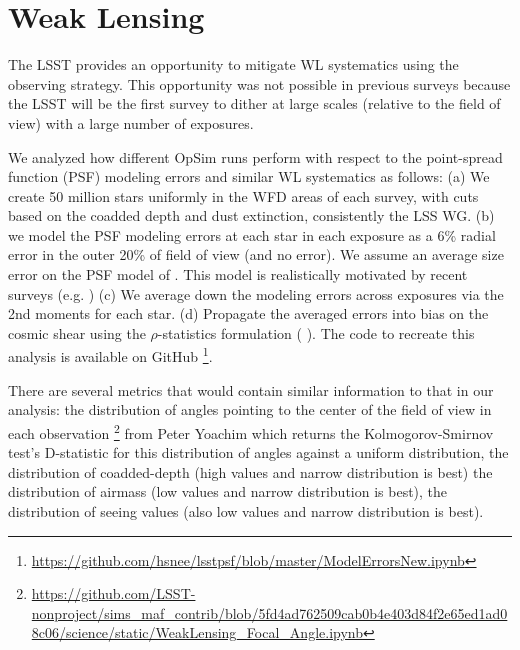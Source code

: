 \section{Weak Lensing}\label{sec:wl}

The LSST provides an opportunity to mitigate WL systematics using the observing strategy. This opportunity was not possible in previous surveys because the LSST will be the first survey to dither at large scales (relative to the field of view) with a large number of exposures.

We analyzed how different OpSim runs perform with respect to the point-spread function (PSF) modeling errors and similar WL systematics as follows: (a) We create 50 million stars uniformly in the WFD areas of each survey, with cuts based on the coadded depth and dust extinction, consistently the LSS WG. (b) we model the PSF modeling errors at each star in each exposure as a 6\% radial error in the outer 20\% of field of view (and no error). We assume an average size error on the PSF model of . This model is realistically motivated by recent surveys (e.g. \cite{bosche2018}) (c) We average down the modeling errors across exposures via the 2nd moments for each star. (d) Propagate the averaged errors into bias on the cosmic shear using the $\rho$-statistics formulation (\cite{rowe2010} \cite{jarvis2016}). The code to recreate this analysis is available on GitHub \footnote{\url{https://github.com/hsnee/lsstpsf/blob/master/ModelErrorsNew.ipynb}}. 

There are several metrics that would contain similar information to that in our analysis: the distribution of angles pointing to the center of the field of view in each observation \footnote{\url{https://github.com/LSST-nonproject/sims\_maf\_contrib/blob/5fd4ad762509cab0b4e403d84f2e65ed1ad08c06/science/static/WeakLensing\_Focal\_Angle.ipynb}} from Peter Yoachim which returns the Kolmogorov-Smirnov test's D-statistic for this distribution of angles against a uniform distribution, the distribution of coadded-depth (high values and narrow distribution is best) the distribution of airmass (low values and narrow distribution is best), the distribution of seeing values (also low values and narrow distribution is best).


